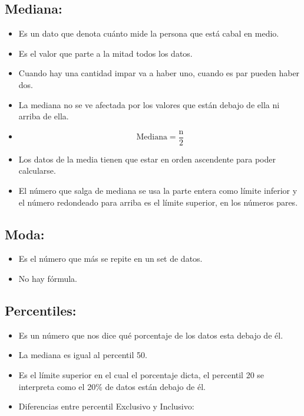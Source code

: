 \subsection{Mediana:}
\begin{itemize}
    \item Es un dato que denota cuánto mide la persona que está cabal en medio.
    \item Es el valor que parte a la mitad todos los datos.
    \item Cuando hay una cantidad impar va a haber uno, cuando es par pueden haber dos.
    \item La mediana no se ve afectada por los valores que están debajo de ella ni arriba de ella.
    \item \[
      \text{Mediana} = \frac{\text{n}}{2} 
    \]
    
    \item Los datos de la media tienen que estar en orden ascendente para poder calcularse.
    \item El número que salga de mediana se usa la parte entera como límite inferior y el número redondeado para arriba es el límite superior, en los números pares.
\end{itemize}

\subsection{Moda:}
\begin{itemize}
    \item Es el número que más se repite en un set de datos.
    \item No hay fórmula.
\end{itemize}


\subsection{Percentiles:}
\begin{itemize}
    \item Es un número que nos dice qué porcentaje de los datos esta debajo de él.
    \item La mediana es igual al percentil 50.
    \item Es el límite superior en el cual el porcentaje dicta, el percentil 20 se interpreta como el 20\% de datos están debajo de él.
    \item Diferencias entre percentil Exclusivo y Inclusivo: 
\end{itemize}

